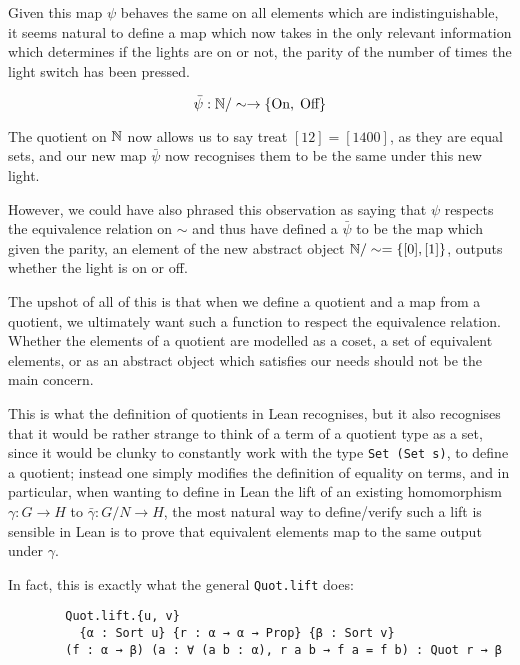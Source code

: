 \begin{remark}
    Given this map $\psi$ behaves the same on all elements which are indistinguishable, it seems natural to 
    define a map which now takes in the only relevant information which determines if the lights are on or not,
    the parity of the number of times the light switch has been pressed.
    
    \[
    \bar{\psi} : \mathbb{N} / \sim \rightarrow \{\text{On}, \; \text{Off}\}
    \]

    The quotient on $\mathbb{N}$ now allows us to say treat $[12] = [1400]$, as they are equal sets, and our new map $\bar{\psi}$ now recognises them to be the same
    under this new light. 

    However, we could have also phrased this observation as saying that $\psi$ respects the equivalence relation on $\sim$ and
    thus have defined a $\bar{\psi}$ to be the map which given the parity, an element of the new abstract object $\mathbb{N} / \sim = \{[0], [1]\}$,
    outputs whether the light is on or off. 

    The upshot of all of this is that when we define a quotient and a map from a quotient, we ultimately want such a function to respect the equivalence relation. Whether the elements of a quotient are
    modelled as a coset, a set of equivalent elements, or as an abstract object which satisfies our needs should not be the main concern. 

    This is what the definition of quotients in Lean recognises, but it also recognises that it would be rather strange to think of a term of a quotient type as a set, since it would be clunky to  constantly work with
    the type \texttt{Set (Set s)}, to define a quotient;  instead one simply modifies the definition of equality on terms, and in particular, when wanting to define in Lean the lift of an existing homomorphism $\gamma : G \rightarrow H$
    to $\bar{\gamma} : G/N \rightarrow H$, the most natural way to define/verify such a lift is sensible in Lean is to prove that equivalent elements map to the same output under $\gamma$.

    In fact, this is exactly what the general \texttt{Quot.lift} does:

    \begin{footnotesize}
    \begin{verbatim}
        Quot.lift.{u, v} 
          {α : Sort u} {r : α → α → Prop} {β : Sort v} 
        (f : α → β) (a : ∀ (a b : α), r a b → f a = f b) : Quot r → β
    \end{verbatim}
    \end{footnotesize}


\end{remark}
